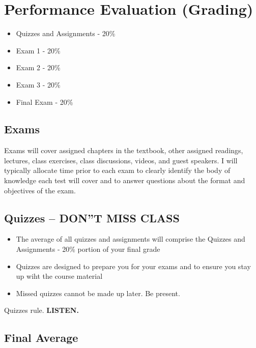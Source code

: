 \documentclass[
]{book}
\providecommand{\tightlist}{%
  \setlength{\itemsep}{0pt}\setlength{\parskip}{0pt}}
\begin{document}
\hypertarget{performance-evaluation-grading}{%
\section{Performance Evaluation (Grading)}\label{performance-evaluation-grading}}

\begin{itemize}
\tightlist
\item
  Quizzes and Assignments - 20\%
\item
  Exam 1 - 20\%
\item
  Exam 2 - 20\%
\item
  Exam 3 - 20\%
\item
  Final Exam - 20\%
\end{itemize}

\hypertarget{exams}{%
\subsection{Exams}\label{exams}}

Exams will cover assigned chapters in the textbook, other assigned readings, lectures, class exercises, class discussions, videos, and guest speakers. I will typically allocate time prior to each exam to clearly identify the body of knowledge each test will cover and to answer questions about the format and objectives of the exam.

\hypertarget{quizzes-dont-miss-class}{%
\subsection{\texorpdfstring{Quizzes -- \textbf{DON''T MISS CLASS}}{Quizzes -- DON''T MISS CLASS}}\label{quizzes-dont-miss-class}}

\begin{itemize}
\tightlist
\item
  The average of all quizzes and assignments will comprise the Quizzes and Assignments - 20\% portion of your final grade
\item
  Quizzes are designed to prepare you for your exams and to ensure you stay up wiht the course material
\item
  Missed quizzes cannot be made up later. Be present.
\end{itemize}

Quizzes rule. \textbf{LISTEN.}

\hypertarget{final-average}{%
\subsection{Final Average}\label{final-average}}
\end{document}
